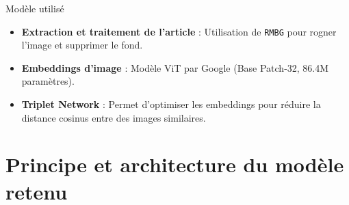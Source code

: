 \documentclass{beamer}
\begin{document}
\begin{frame}{Modèle utilisé}
    \begin{itemize}
        \item \textbf{Extraction et traitement de l'article} : Utilisation de \texttt{RMBG} pour rogner l'image et supprimer le fond. 
        \item \textbf{Embeddings d'image} : Modèle ViT par Google (Base Patch-32, 86.4M paramètres).
        \item \textbf{Triplet Network} : Permet d'optimiser les embeddings pour réduire la distance cosinus entre des images similaires.
    \end{itemize}
    \end{frame}

\section{Principe et architecture du modèle retenu}
\end{document}
